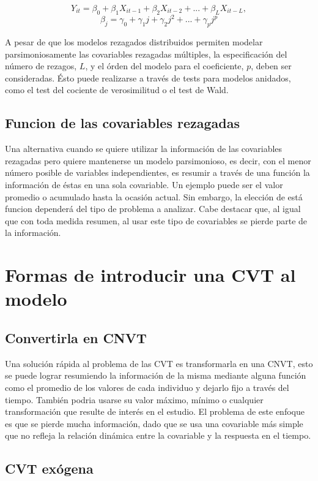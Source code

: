 \documentclass[spanish]{article}
\numberwithin{figure}{subsection}
\numberwithin{equation}{subsection}
\numberwithin{table}{subsection}
\begin{document}
\[ Y_{it} = \beta_0 + \beta_1 X_{it-1} + \beta_2 X_{it-2} + ... +
\beta_L X_{it-L}, \]
\[ \beta_j = \gamma_0 + \gamma_1 j + \gamma_2 j^2 + ... + \gamma_p j^p \]

A pesar de que los modelos rezagados distribuidos permiten modelar
parsimoniosamente las covariables rezagadas múltiples, la especificación del
número de rezagos, $L$, y el órden del modelo para el coeficiente, $p$, deben
ser consideradas. Ésto puede realizarse a través de tests para modelos
anidados, como el test del cociente de verosimilitud o el test de Wald.

\subsection{Funcion de las covariables rezagadas}

Una alternativa cuando se quiere utilizar la información de las covariables
rezagadas pero quiere mantenerse un modelo parsimonioso, es decir, con el menor
número posible de variables independientes, es resumir a través de una función
la información de éstas en una sola covariable. Un ejemplo puede ser el valor
promedio o acumulado hasta la ocasión actual. Sin embargo, la elección de está
funcion dependerá del tipo de problema a analizar. Cabe destacar que, al igual
que con toda medida resumen, al usar este tipo de covariables se pierde
parte de la información.

\section{Formas de introducir una CVT al modelo}

\subsection{Convertirla en CNVT}

Una solución rápida al problema de las CVT es transformarla en una CNVT, esto
se puede lograr resumiendo la información de la misma mediante alguna función
como el promedio de los valores de cada individuo y dejarlo fijo a través del
tiempo. También podria usarse su valor máximo, mínimo o cualquier
transformación que resulte de interés en el estudio. El problema de este
enfoque es que se pierde mucha información, dado que se usa una covariable más
simple que no refleja la relación dinámica entre la covariable y la respuesta
en el tiempo.

\subsection{CVT exógena}
\end{document}
